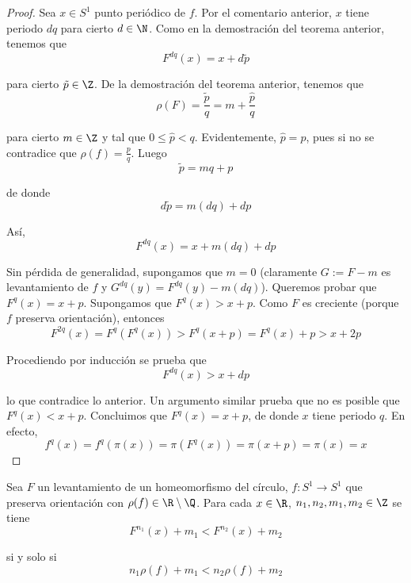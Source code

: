 \documentclass[	docname= Sistemas\ Din\'amicos,
				finished=1,
				semester=1,
				year=2017,
				professor=Godofredo\ Iommi,
				sigla=MAT2565]{apunte}
\begin{document}
\begin{proof} Sea $x \in S^{1}$ punto periódico de $f$. Por el comentario anterior, $x$ tiene periodo $dq$ para cierto $d \in \N$. Como en la demostración del teorema anterior, tenemos que
	$$F^{dq}(x) = x + d\tilde{p}$$

para cierto $\tilde{p} \in \Z$. De la demostración del teorema anterior, tenemos que
	$$\rho(F) = \frac{\tilde{p}}{q} = m + \frac{\hat{p}}{q}$$

para cierto $m \in \Z$ y tal que $0 \leq \hat{p} < q$. Evidentemente, $\hat{p} = p$, pues si no se contradice que $\rho(f) = \frac{p}{q}$. Luego
	$$\tilde{p} = mq + p$$
	
de donde
	$$d\tilde{p} = m(dq) + dp$$

Así,
	$$F^{dq}(x) = x + m(dq) + dp$$

Sin pérdida de generalidad, supongamos que $m = 0$ (claramente $G:= F - m$ es levantamiento de $f$ y $G^{dq}(y) = F^{dq}(y) -m(dq)$). Queremos probar que $F^{q}(x) = x + p$. Supongamos que $F^{q}(x) > x+p$. Como $F$ es creciente (porque $f$ preserva orientación), entonces
	$$F^{2q}(x) = F^{q}(F^{q}(x)) > F^{q}(x+p) = F^{q}(x) + p > x + 2p$$

Procediendo por inducción se prueba que
	$$F^{dq}(x) > x + dp$$

lo que contradice lo anterior. Un argumento similar prueba que no es posible que $F^{q}(x) < x +p$. Concluimos que $F^{q}(x) = x +p$, de donde $x$ tiene periodo $q$. En efecto,
	$$f^{q}(x) = f^{q}(\pi(x)) = \pi(F^{q}(x)) = \pi(x+p) = \pi(x) = x$$ 
\end{proof}

\begin{prop}  Sea $F$ un levantamiento de un homeomorfismo del círculo, $f: S^{1} \to S^{1}$ que preserva orientación con $\rho(f) \in \R\setminus \Q$. Para cada $x \in \R$, $n_{1}, n_{2}, m_{1}, m_{2} \in \Z$ se tiene
	$$F^{n_{1}}(x) + m_{1} < F^{n_{2}}(x) + m_{2}$$

si y solo si
	$$n_{1}\rho(f) + m_{1} < n_{2}\rho(f) + m_{2}$$
\end{prop}
\end{document}
